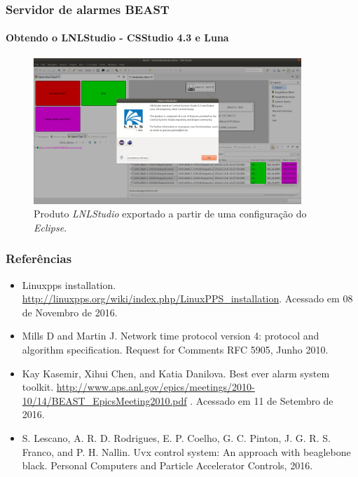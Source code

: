\documentclass{beamer}
\begin{document}

\begin{frame}
\frametitle{Servidor de alarmes BEAST}
\framesubtitle{Obtendo o LNLStudio - CSStudio 4.3 e Luna}
\begin{figure}[h]
\centering
\includegraphics[width=0.90\textwidth]{image/lnlstudio}
\caption {\centering Produto \textit{LNLStudio} exportado a partir de uma
configuração do \textit{Eclipse}.}
\label{fig:lnlstudio}
\end{figure}

\end{frame}

\begin{frame}
\frametitle{Referências}

{\small
\begin{itemize}
  \item Linuxpps installation. 
  \url{http://linuxpps.org/wiki/index.php/LinuxPPS_installation}. Acessado em 08 de Novembro de 2016.
  \item Mills D and Martin J. Network time protocol version 4: protocol and
  algorithm specification. Request for Comments RFC 5905, Junho 2010.
\item  Kay Kasemir, Xihui Chen, and Katia Danilova. Best ever alarm system
toolkit. \url{http://www.aps.anl.gov/epics/meetings/2010-10/14/BEAST_EpicsMeeting2010.pdf} . Acessado em 11 de Setembro de 2016.
\item S. Lescano, A. R. D. Rodrigues, E. P. Coelho, G. C. Pinton, J. G. R. S.
 Franco, and P. H. Nallin. Uvx control system: An approach with beaglebone
 black. Personal Computers and Particle Accelerator Controls, 2016.
\end{itemize}
}
\end{frame}
\end{document}
